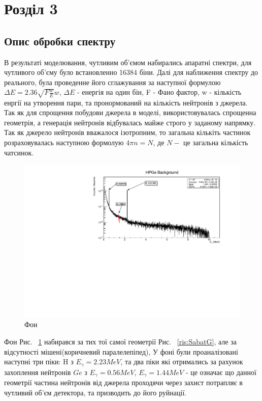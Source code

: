 \documentclass[a4paper, 14pt]{article}
\numberwithin{equation}{section}
\numberwithin{table}{section}
\begin{document}
	
\newpage 
\section{Розділ 3}
\setcounter{figure}{0}
\subsection{Опис обробки спектру}

В результаті моделювання, чутливим об'ємом набирались апаратні спектри, для чутливого об'єму було встановленно 16384 біни. Далі для наближення спектру до реального, була проведенне його сглажування за наступної формулою $\Delta{E} = 2.36 \sqrt{F  \frac{w}{E}}  w$, $\Delta{E}$ - енергія на один бін, F - Фано фактор, w - кількість енргії на утворення пари, та пронормований на кількість нейтронів з джерела. Так як для спрощення побудови джерела в моделі, використовувалась спрощенна геометрія, а генерація нейтронів відбувалась майже строго у заданому напрямку. Так як джерело нейтронів вважалося ізотропним, то загальна кількіть частинок розраховувалась наступною формолую $ 4 \pi n = N$, де $N -$ це загальна кількість чатсинок.
\begin{figure}[hbt!]
	\centering \includegraphics[width=1\textwidth]{res/smFonPiscks.pdf}
	\caption{Фон} 
	\label{ris:FonPicks}	
\end{figure} 
Фон Рис. ~\ref{ris:FonPicks} набирався за тих тої самої геометрії Рис. ~\ref{ris:SabatG}, але за відсутності мішені(коричневий паралелепіпед), У фоні були проаналізовані наступні три піки: H з $E_\gamma = 2.23 MeV$, та два піки які отримались за рахунок захоплення нейтронів $Ge$ з $E_\gamma = 0.56MeV$, $E_\gamma = 1.44 MeV$ - це означає що данної геометрії частина нейтронів від джерела проходячи через захист потрапляє в чутливий об'єм детектора, та призводить до його руйнації. 
\end{document}
